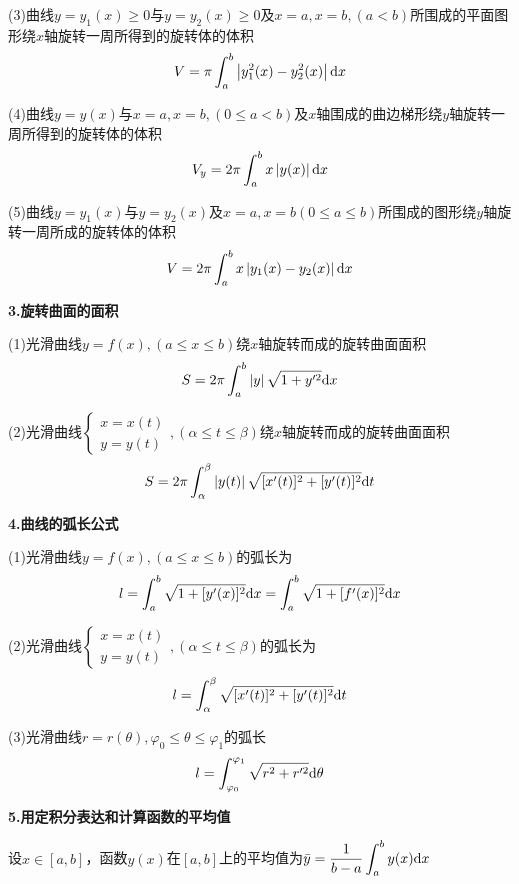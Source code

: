 (3)曲线$y=y_1(x)\geq0$与$y=y_2(x)\geq0$及$x=a,x=b,(a<b)$所围成的平面图形绕$x$轴旋转一周所得到的旋转体的体积
\begin{equation}
    V=\pi\int_a^b \left| y_1^2(x)-y_2^2(x) \right| \mathrm{d} x
    \nonumber
\end{equation}

(4)曲线$y=y(x)$与$x=a,x=b,(0\leq a<b)$及$x$轴围成的曲边梯形绕$y$轴旋转一周所得到的旋转体的体积
\begin{equation}
    V_y=2\pi\int_a^b x\left|y(x)\right| \mathrm{d} x
    \nonumber
\end{equation}

(5)曲线$y=y_1(x)$与$y=y_2(x)$及$x=a,x=b(0\leq a\leq b)$所围成的图形绕$y$轴旋转一周所成的旋转体的体积
\begin{equation}
    V=2\pi\int_a^b x\left|y_1(x)-y_2(x)\right| \mathrm{d} x
    \nonumber
\end{equation}

\textbf{3.旋转曲面的面积}

(1)光滑曲线$y=f(x),(a\leq x\leq b)$绕$x$轴旋转而成的旋转曲面面积
\begin{equation}
    S=2\pi \int_a^b \left|y\right|\sqrt{1+y'^2} \mathrm{d} x
    \nonumber
\end{equation}

(2)光滑曲线$\left\{\begin{aligned}
    x=x(t) \\
    y=y(t)
\end{aligned}\right.,(\alpha\leq t\leq \beta)$绕$x$轴旋转而成的旋转曲面面积
\begin{equation}
    S=2\pi \int_\alpha^\beta \left|y(t)\right|\sqrt{[x'(t)]^2+[y'(t)]^2}\mathrm{d} t
    \nonumber
\end{equation}

\textbf{4.曲线的弧长公式}

(1)光滑曲线$y=f(x),(a\leq x\leq b)$的弧长为
\begin{equation}
    l=\int_a^b\sqrt{1+[y'(x)]^2}\mathrm{d} x=\int_a^b\sqrt{1+[f'(x)]^2}\mathrm{d} x
    \nonumber
\end{equation}

(2)光滑曲线$\left\{\begin{aligned}
    x=x(t) \\
    y=y(t)
\end{aligned}\right.,(\alpha\leq t\leq \beta)$的弧长为
\begin{equation}
    l=\int_\alpha^\beta\sqrt{[x'(t)]^2+[y'(t)]^2}\mathrm{d} t
    \nonumber
\end{equation}

(3)光滑曲线$r=r(\theta),\varphi_0\leq\theta\leq\varphi_1$的弧长
\begin{equation}
    l=\int_{\varphi_0}^{\varphi_1}\sqrt{r^2+r'^2}\mathrm{d} \theta
    \nonumber
\end{equation}

\textbf{5.用定积分表达和计算函数的平均值}

设$x\in[a,b]$，函数$y(x)$在$[a,b]$上的平均值为$\bar{y}=\dfrac{1}{b-a}\displaystyle\int_a^b y(x)\mathrm{d} x$